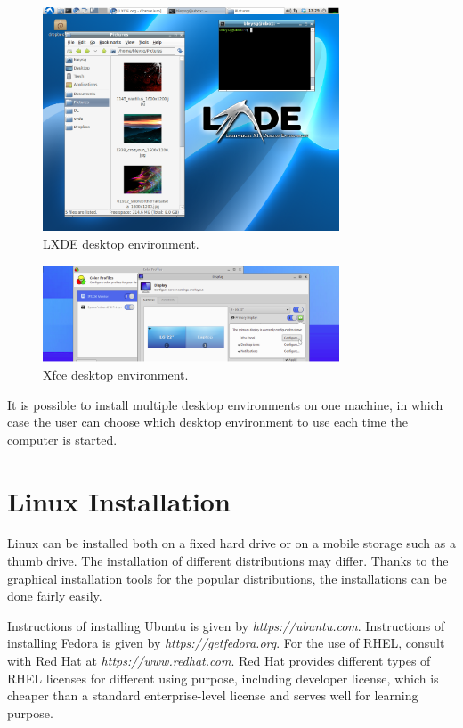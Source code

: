 \begin{figure}[htbp]
	\centering
	\includegraphics[width=250pt]{chapters/ch-brief-introduction-to-linux/figures/lxde_demo.png}
	\caption{LXDE desktop environment.} \label{ch:bitl:fig:lxdedemo}
\end{figure}

\begin{figure}[htbp]
	\centering
	\includegraphics[width=250pt]{chapters/ch-brief-introduction-to-linux/figures/xfce_demo.png}
	\caption{Xfce desktop environment.} \label{ch:bitl:fig:xfcedemo}
\end{figure}

It is possible to install multiple desktop environments on one machine, in which case the user can choose which desktop environment to use each time the computer is started.

\section{Linux Installation}

Linux can be installed both on a fixed hard drive or on a mobile storage such as a thumb drive. The installation of different distributions may differ. Thanks to the graphical installation tools for the popular distributions, the installations can be done fairly easily.

Instructions of installing Ubuntu is given by \textit{https://ubuntu.com}. Instructions of installing Fedora is given by \textit{https://getfedora.org}. For the use of RHEL, consult with Red Hat at \textit{https://www.redhat.com}. Red Hat provides different types of RHEL licenses for different using purpose, including developer license, which is cheaper than a standard enterprise-level license and serves well for learning purpose.
